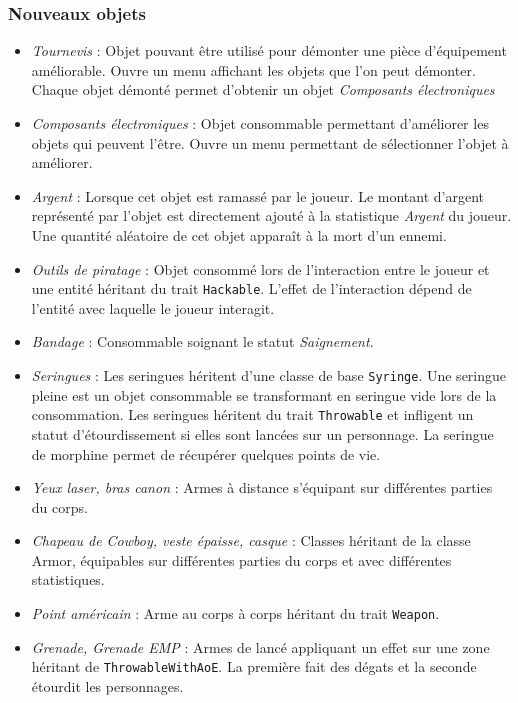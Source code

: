\documentclass[10pt,a4paper]{article}
\begin{document}
\subsubsection{Nouveaux objets}
\begin{itemize}
    \item \emph{Tournevis} : Objet pouvant être utilisé pour démonter une pièce d'équipement améliorable. Ouvre un menu affichant les objets que l'on peut démonter. Chaque objet démonté permet d'obtenir un objet \emph{Composants électroniques}
    \item \emph{Composants électroniques} : Objet consommable permettant d'améliorer les objets qui peuvent l'être. Ouvre un menu permettant de sélectionner l'objet à améliorer.
    \item \emph{Argent} : Lorsque cet objet est ramassé par le joueur. Le montant d'argent représenté par l'objet est directement ajouté à la statistique \emph{Argent} du joueur. Une quantité aléatoire de cet objet apparaît à la mort d'un ennemi.
    \item \emph{Outils de piratage} : Objet consommé lors de l'interaction entre le joueur et une entité héritant du trait \texttt{Hackable}. L'effet de l'interaction dépend de l'entité avec laquelle le joueur interagit.
    \item \emph{Bandage} : Consommable soignant le statut \emph{Saignement}.
    \item \emph{Seringues} : Les seringues héritent d'une classe de base \texttt{Syringe}. Une seringue pleine est un objet consommable se transformant en seringue vide lors de la consommation. Les seringues héritent du trait \texttt{Throwable} et infligent un statut d'étourdissement si elles sont lancées sur un personnage. La seringue de morphine permet de récupérer quelques points de vie.
    \item \emph{Yeux laser, bras canon} : Armes à distance s'équipant sur différentes parties du corps.
    \item \emph{Chapeau de Cowboy, veste épaisse, casque} : Classes héritant de la classe Armor, équipables sur différentes parties du corps et avec différentes statistiques.
    \item \emph{Point américain} : Arme au corps à corps héritant du trait \texttt{Weapon}.
    \item \emph{Grenade, Grenade EMP} : Armes de lancé appliquant un effet sur une zone héritant de \texttt{ThrowableWithAoE}. La première fait des dégats et la seconde étourdit les personnages.
\end{itemize}
\end{document}

